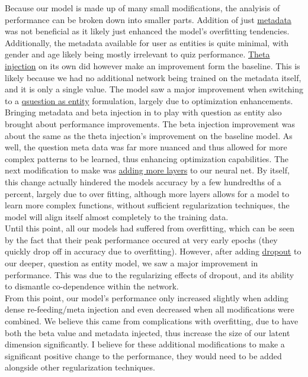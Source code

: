 \documentclass{article}
\begin{document}
Because our model is made up of many small modifications, the analyisis of performance can be broken down into smaller parts. Addition of just \underline{metadata} was not beneficial as it likely just enhanced the model's overfitting tendencies. Additionally, the metadata available for user as entities is quite minimal, with gender and age likely being mostly irrelevant to quiz performance. \underline{Theta injection} on its own did however make an improvement form the baseline. This is likely because we had no additional network being trained on the metadata itself, and it is only a single value. The model saw a major improvement when switching to a \underline{qsuestion as entity} formulation, largely due to optimization enhancements.
\\

\noindent Bringing metadata and beta injection in to play with question as entity also brought about performance improvements. The beta injection improvement was about the same as the theta injection's improvement on the baseline model. As well, the question meta data was far more nuanced and thus allowed for more complex patterns to be learned, thus enhancing optimization capabilities. The next modification to make was \underline{adding more layers} to our neural net. By itself, this change actually hindered the models accuracy by a few hundredths of a percent, largely due to over fitting, although more layers allows for a model to learn more complex functions, without sufficient regularization techniques, the model will align itself almost completely to the training data.
\\

\noindent Until this point, all our models had suffered from overfitting, which can be seen by the fact that their peak performance occured at very early epochs (they quickly drop off in accuracy due to overfitting). However, after adding \underline{dropout} to our deeper, question as entity model, we saw a major improvement in performance. This was due to the regularizing effects of dropout, and its ability to dismantle co-dependence within the network. 
\\

\noindent From this point, our model's performance only increased slightly when adding dense re-feeding/meta injection and even decreased when all modifications were combined. We believe this came from complications with overfitting, due to have both the beta value and metadata injected, thus increase the size of our latent dimension significantly. I believe for these additional modifications to make a significant positive change to the performance, they would need to be added alongside other regularization techniques.
\end{document}
